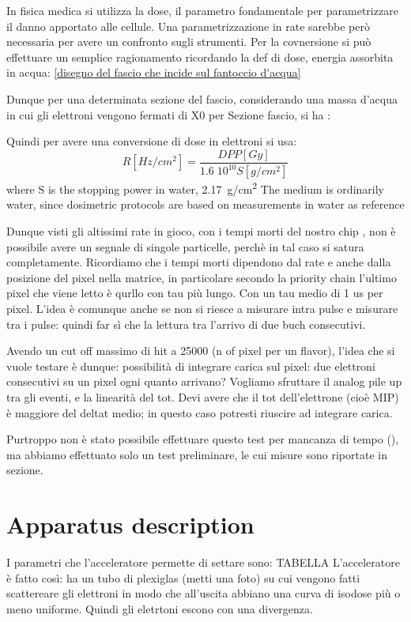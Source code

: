 In fisica medica si utilizza la dose, il parametro fondamentale per parametrizzare il danno apportato alle cellule. Una parametrizzazione in rate sarebbe però necessaria per avere un confronto sugli strumenti. 
Per la covnersione si può effettuare un semplice ragionamento ricordando la def di dose, energia assorbita in acqua: 
\ref{disegno del fascio che incide sul fantoccio d'acqua}

Dunque per una determinata sezione del fascio, considerando una massa d'acqua in cui gli elettroni vengono fermati di X0 per Sezione fascio, si ha :


Quindi per avere una conversione di dose in elettroni si usa:
\begin{equation}
   R[Hz/cm^2] = \frac{DPP[Gy]}{1.6 \;10^{10} S[g/cm^2]}
\end{equation}
where S is the stopping power in water, \SI{2.17}{g/cm\squared}
The medium is ordinarily water, since dosimetric protocols are based on measurements in water as reference


Dunque visti gli altissimi rate in gioco, con i tempi morti del nostro chip , non è possibile avere un segnale di singole particelle, perchè in tal caso si satura completamente. 
Ricordiamo che i tempi morti dipendono dal rate e anche dalla posizione del pixel nella matrice, in particolare secondo la priority chain l'ultimo pixel che viene letto è qurllo con tau più lungo. Con un tau medio di 1 us per pixel. 
L'idea è comunque anche se non si riesce a misurare intra pulse e misurare tra i pulse: quindi far sì che la lettura tra l'arrivo di due buch consecutivi. 

Avendo un cut off massimo di hit a 25000 (n of pixel per un flavor), l'idea che si vuole testare è dunque: possibilità di integrare carica sul pixel: due elettroni consecutivi su un pixel ogni quanto arrivano?
Vogliamo sfruttare il analog pile up tra gli eventi, e la linearità del tot. 
Devi avere che il tot dell'elettrone (cioè MIP) è maggiore del deltat medio; in questo caso potresti riuscire ad integrare carica.

Purtroppo non è stato possibile effettuare questo test per mancanza di tempo (), ma abbiamo effettuato solo un test preliminare, le cui misure sono riportate in sezione. 
   

\section{Apparatus description}
   I parametri che l'acceleratore permette di settare sono: TABELLA
   L'acceleratore è fatto così: ha un tubo di plexiglas (metti una foto) su cui vengono fatti scattereare gli elettroni in modo che all'uscita abbiano una curva di isodose più o meno uniforme. Quindi gli eletrtoni escono con una divergenza.

